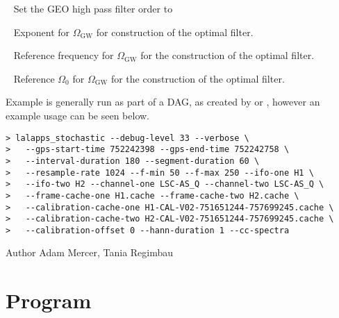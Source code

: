 \begin{entry}
\begin{entry}
\item[\option{--geo-hpf-order}~\parm{N}]
Set the GEO high pass filter order to 

\item[\option{--alpha}~\parm{N}]
Exponent for $\Omega_{\mathrm{GW}}$ for construction of the optimal
filter.

\item[\option{--f-ref}~\parm{N}]
Reference frequency for $\Omega_{\mathrm{GW}}$ for the construction of
the optimal filter.

\item[\option{--omega0}~\parm{N}]
Reference $\Omega_0$ for $\Omega_{\mathrm{GW}}$ for the construction of
the optimal filter.
\end{entry}

\item[Example]
 is generally run as part of a DAG, as created
by  or
, however an example usage can be seen
below.

\begin{verbatim}
> lalapps_stochastic --debug-level 33 --verbose \
>   --gps-start-time 752242398 --gps-end-time 752242758 \
>   --interval-duration 180 --segment-duration 60 \
>   --resample-rate 1024 --f-min 50 --f-max 250 --ifo-one H1 \
>   --ifo-two H2 --channel-one LSC-AS_Q --channel-two LSC-AS_Q \
>   --frame-cache-one H1.cache --frame-cache-two H2.cache \
>   --calibration-cache-one H1-CAL-V02-751651244-757699245.cache \
>   --calibration-cache-two H2-CAL-V02-751651244-757699245.cache \
>   --calibration-offset 0 --hann-duration 1 --cc-spectra
\end{verbatim}

\item[Author] 
Adam Mercer, Tania Regimbau
\end{entry}
\clearpage

\clearpage
\section{Program }
\label{program:lalapps-stopp}

